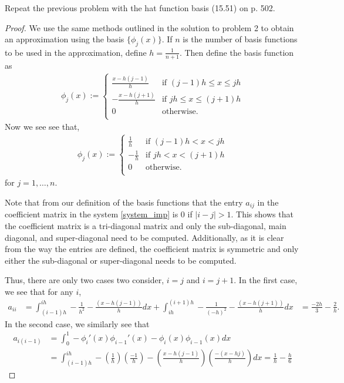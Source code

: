 \begin{problem}
  Repeat the previous problem with the hat function basis (15.51) on p. 502.
\end{problem}

\begin{proof}
  We use the same methods outlined in the solution to problem 2 to obtain an
  approximation using the basis $\{\phi_j(x) \}$. If $n$ is the number of basis functions
  to be used in the approximation, define $h = \frac{1}{n+1}$. Then define the basis function
  as
  \begin{align*}
    \phi_j(x) :=
    \begin{cases}
      \frac{x - h(j-1)}{h} & \text{if $(j-1)h \leq x \leq jh$} \\
      -\frac{x - h(j+1)}{h} & \text{if $jh \leq x \leq (j + 1)h$} \\
      0 & \text{otherwise}. \\
    \end{cases}
  \end{align*}
  Now we see see that,
  \begin{align*}
    \phi_j(x) :=
    \begin{cases}
      \frac{1}{h} & \text{if $(j-1)h < x < jh$} \\
      -\frac{1}{h} & \text{if $jh < x < (j + 1)h$} \\
      0 & \text{otherwise}. \\
    \end{cases}
  \end{align*}
  for $j=1,\dots,n$.

  Note that from our definition of the basis functions that the entry $a_{ij}$
  in the coefficient matrix in the system \eqref{system_imp} is 0 if $|i - j| > 1$.
  This shows that the coefficient matrix is a tri-diagonal matrix and only
  the sub-diagonal, main diagonal, and super-diagonal need to be computed. Additionally,
  as it is clear from the way the entries are defined, the coefficient matrix
  is symmetric and only either the sub-diagonal or super-diagonal needs to be computed.

  Thus, there are only two cases two consider, $i = j$ and $i = j + 1$.
  In the first case, we see that for any $i$,
  \begin{align*}
    a_{ii}
    &= \int_{(i-1)h}^{ih} - \frac{1}{h^2} - \frac{(x - h(j-1))}{h} dx +
    \int_{ih}^{(i+1)h} - \frac{1}{(-h)^2} - \frac{(x - h(j+1))}{h} dx
    &= \frac{-2h}{3} - \frac{2}{h}.
  \end{align*}
  In the second case, we similarly see that
  \begin{align*}
    a_{i(i-1)} &=
    \int_{0}^1 -\phi_{i}'(x)\phi_{i-1}'(x) - \phi_{i}(x)\phi_{i-1}(x) dx \\
    &= \int_{(i-1)h}^{ih} -\left(\frac{1}{h}\right)\left(\frac{-1}{h}\right) - \left(\frac{x - h(j-1)}{h}\right)\left(\frac{-(x - hj)}{h}\right)dx
    = \frac{1}{h} - \frac{h}{6}
  \end{align*}


\end{proof}
